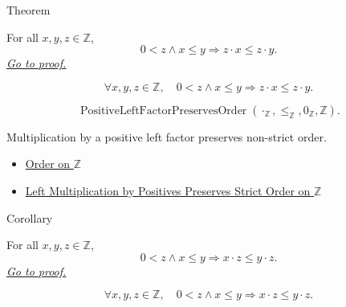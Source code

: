 \begin{theorembox}{Theorem}
\begin{theorem}
\label{thm:left-positive-multiplication-preserves-order-on-z}
For all $x,y,z\in\mathbb{Z}$,
\[
0<z\land x\le y \Longrightarrow z\cdot x\le z\cdot y.
\]
\hyperref[prf:left-positive-multiplication-preserves-order-on-z]{\textit{Go to proof.}}
\end{theorem}
\end{theorembox}

\begin{remark*}
\[
\forall x,y,z\in\mathbb{Z},\quad
0<z\land x\le y \Longrightarrow z\cdot x\le z\cdot y.
\]
\end{remark*}

\begin{remark*}
\[
\operatorname{PositiveLeftFactorPreservesOrder}(\cdot_{\mathbb{Z}},\le_{\mathbb{Z}},0_{\mathbb{Z}},\mathbb{Z}).
\]
\end{remark*}

\begin{remark*}[Interpretation]
Multiplication by a positive left factor preserves non-strict order.
\end{remark*}

\begin{dependencies}
\begin{itemize}
  \item \hyperref[def:order-on-z]{Order on $\mathbb{Z}$}
  \item \hyperref[thm:left-positive-multiplication-preserves-strict-order-on-z]{Left Multiplication by Positives Preserves Strict Order on $\mathbb{Z}$}
\end{itemize}
\end{dependencies}

\begin{corollarybox}{Corollary}
\begin{corollary}
\label{cor:right-positive-multiplication-preserves-order-on-z}
For all $x,y,z\in\mathbb{Z}$,
\[
0<z\land x\le y \Longrightarrow x\cdot z\le y\cdot z.
\]
\hyperref[prf:right-positive-multiplication-preserves-order-on-z]{\textit{Go to proof.}}
\end{corollary}
\end{corollarybox}

\begin{remark*}
\[
\forall x,y,z\in\mathbb{Z},\quad
0<z\land x\le y \Longrightarrow x\cdot z\le y\cdot z.
\]
\end{remark*}

